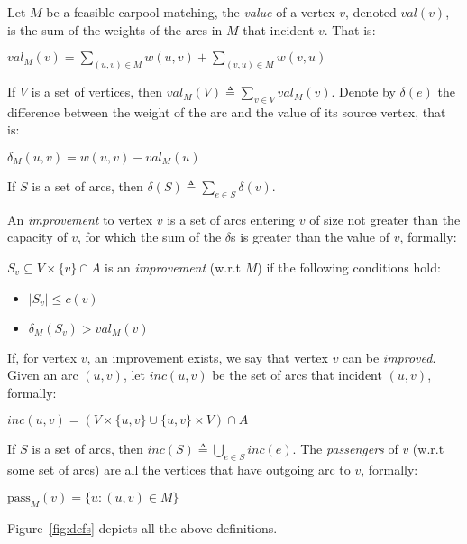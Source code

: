 
Let $M$ be a feasible carpool matching,
the \emph{value} of a vertex $v$, denoted $val(v)$, 
is the sum of the weights of the arcs in $M$ that incident $v$. 
That is: 
%
\begin{definition}[$val$]
$val_M(v) = \sum_{(u, v) \in M} w(u, v) + \sum_{(v, u) \in M} w(v, u)$
\end{definition}
%
If $V$ is a set of vertices, then $val_M(V) \triangleq \sum_{v \in V} val_M(v)$.
%
Denote by $\delta(e)$ the difference between the weight of the arc and the value
of its source vertex,
that is:
%
\begin{definition}[$\delta$]
$\delta_M(u, v) = w(u, v) - val_M(u)$
\end{definition}
%
If $S$ is a set of arcs, then $\delta(S) \triangleq \sum_{e \in S}\delta(v)$.

An \emph{improvement} to vertex $v$ 
is a set of arcs entering $v$ of size not greater than the capacity of $v$, 
for which the sum of the $\delta$s is greater than the value of $v$,
formally: 

\begin{definition}[improvement]
$S_v \subseteq V \times \{v\} \cap A$ is an \emph{improvement} (w.r.t $M$)
if the following conditions hold:
\begin{itemize}
\item
$|S_v| \leq c(v)$
\item
$\delta_M(S_v) > val_M(v)$
\end{itemize}  
\end{definition}
%
If, for vertex $v$, an improvement exists, we say that vertex $v$ can be \emph{improved}.
%
Given an arc $(u,v)$, 
let $inc(u,v)$ be the set of arcs that incident $(u, v)$,
formally:
%
\begin{definition}[inc]
$inc(u,v) = (V \times \{u, v\} \cup \{u, v\} \times V) \cap A$
\end{definition}
%
If $S$ is a set of arcs, then $inc(S) \triangleq \bigcup_{e \in S} inc(e)$.
%
The \emph{passengers} of $v$ (w.r.t some set of arcs) are all the vertices that have
outgoing arc to $v$, formally: 
%
\begin{definition}[passengers]
$\text{pass}_M(v) = \{u : (u, v) \in M\}$
\end{definition}
%
Figure~\ref{fig:defs} depicts all the above definitions.

